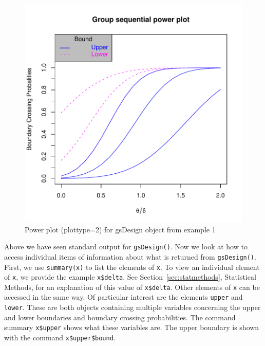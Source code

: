 \begin{figure}
\begin{center}
\includegraphics[width=.6\textwidth]{figs/powerplot.pdf}
\end{center}
\caption{Power plot (plottype=2) for gsDesign object from example 1}
\end{figure}%


\bigskip

Above we have seen standard output for \texttt{gsDesign()}. Now we look at how
to access individual items of information about what is returned from
\texttt{gsDesign()}. First, we use \texttt{summary(x)} to list the elements of
\texttt{x}. To view an individual element of \texttt{x}, we provide the
example \texttt{x\$delta}. See Section~\ref{sec:statmethods}, Statistical Methods, for an explanation of this value of \texttt{x\$delta}. Other elements of 
\texttt{x} can be accessed in the same way. Of particular interest are the 
elements \texttt{upper} and \texttt{lower}. These are both objects containing 
multiple variables concerning the upper and lower boundaries and boundary 
crossing probabilities.
The command summary \texttt{x\$upper} shows what these variables are. 
The upper boundary is shown with the command \texttt{x\$upper\$bound}.

\bigskip

